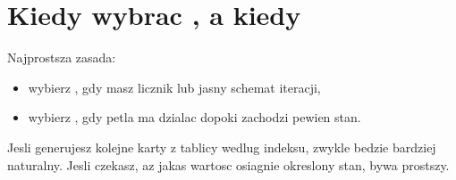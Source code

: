 \section{Kiedy wybrac , a kiedy }
Najprostsza zasada:

\begin{itemize}
  \item wybierz , gdy masz licznik lub jasny schemat iteracji,
  \item wybierz , gdy petla ma dzialac dopoki zachodzi pewien stan.
\end{itemize}

Jesli generujesz kolejne karty z tablicy wedlug indeksu,  zwykle bedzie
bardziej naturalny. Jesli czekasz, az jakas wartosc osiagnie okreslony stan,
 bywa prostszy.
